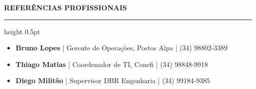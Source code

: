 \documentclass[10pt,a4paper]{article}
\newcommand{\cvsection}[1]{
    \vspace{12pt}
    {\large\textcolor{sectcol}{\textbf{\MakeUppercase{#1}}}}
    \vspace{2pt}
    \hrule height 0.5pt \relax
    \vspace{6pt}
}
\begin{document}
\cvsection{Referências Profissionais}
\begin{itemize}[label=\faUserCheck, leftmargin=1.5em]
    \item \textbf{Bruno Lopes} | Gerente de Operações, Postos Alpa | (34) 98802-3389
    \item \textbf{Thiago Matias} | Coordenador de TI, Conefi | (34) 98848-9918
    \item \textbf{Diego Militão} | Supervisor DBR Engenharia | (34) 99184-9385
\end{itemize}

\vfill
\center{\footnotesize \textcolor{lightgray}{Documento gerado em \LaTeX \ | Disponível para validação via GitHub.}}
\end{document}
